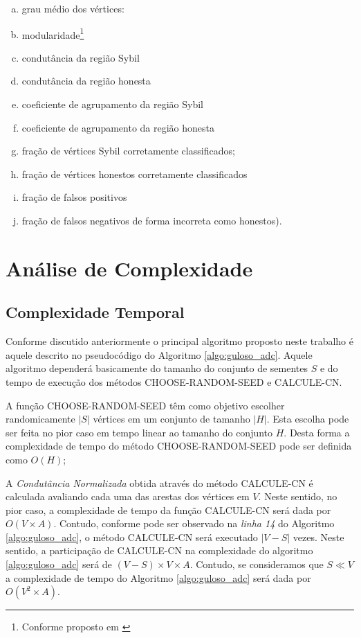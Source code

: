 \documentclass[12pt]{article}
\begin{document}
\begin{enumerate}[(a)]
	\item grau médio dos vértices:
	\item modularidade\footnote{Conforme proposto em \cite{mislove2010you}}
	\item condutância da região Sybil
	\item condutância da região honesta
	\item coeficiente de agrupamento da região Sybil
	\item coeficiente de agrupamento da região honesta
	\item fração de vértices Sybil corretamente classificados;
	\item fração de vértices honestos corretamente classificados
	\item fração de falsos positivos
	\item fração de falsos negativos
de forma incorreta como honestos).
\end{enumerate}


\section{Análise de Complexidade}
\label{sec:analise_complexidade}

\subsection{Complexidade Temporal}
\label{subsec:complex_temporal}

Conforme discutido anteriormente o principal algoritmo proposto neste trabalho é aquele descrito no pseudocódigo do Algoritmo \ref{algo:guloso_adc}{}. Aquele algoritmo dependerá basicamente do tamanho do conjunto de sementes $S$ e do tempo de execução dos métodos \textsc{CHOOSE-RANDOM-SEED} e \textsc{CALCULE-CN}.

A função \textsc{CHOOSE-RANDOM-SEED} têm como objetivo escolher randomicamente $|S|$ vértices em um conjunto de tamanho $|H|$. Esta escolha pode ser feita no pior caso em tempo linear ao tamanho do conjunto $H$. Desta forma a complexidade de tempo do método \textsc{CHOOSE-RANDOM-SEED} pode ser definida como $O(H)$;

A \textit{Condutância Normalizada} obtida através do método \textsc{CALCULE-CN} é calculada avaliando cada uma das arestas dos vértices em $V$. Neste sentido, no pior caso, a complexidade de tempo da função \textsc{CALCULE-CN} será dada por $O(V \times A)$. Contudo, conforme pode ser observado na \textit{linha 14} do Algoritmo \ref{algo:guloso_adc}, o método \textsc{CALCULE-CN} será executado $|V-S|$ vezes. Neste sentido, a participação de \textsc{CALCULE-CN} na complexidade do algoritmo \ref{algo:guloso_adc} será de $ (V-S) \times V \times A$. Contudo, se consideramos que $S \ll V$ a complexidade de tempo do Algoritmo \ref{algo:guloso_adc} será dada por $O(V^{2} \times A)$.
\end{document}
